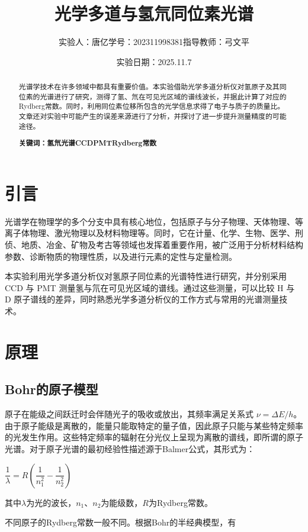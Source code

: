 \documentclass[a4paper, 1.5lines]{ctexart}
\title{光学多道与氢氘同位素光谱}
\author{实验人：唐亿\qquad 学号：202311998381\qquad 指导教师：弓文平}
\date{实验日期：2025.11.7}
\begin{document}
    
    \maketitle
    
    \begin{abstract}
         光谱学技术在许多领域中都具有重要价值。本实验借助光学多道分析仪对氢原子及其同位素的光谱进行了研究，测得了氢、氘在可见光区域的谱线波长，并据此计算了对应的Rydberg常数。同时，利用同位素位移所包含的光学信息求得了电子与质子的质量比。文章还对实验中可能产生的误差来源进行了分析，并探讨了进一步提升测量精度的可能途径。

         \textbf{\textbf{关键词：氢氘光谱\quad CCD\quad PMT\quad Rydberg常数}}
    \end{abstract}
    
    \section{引言}
       光谱学在物理学的多个分支中具有核心地位，包括原子与分子物理、天体物理、等离子体物理、激光物理以及材料物理等。同时，它在计量、化学、生物、医学、刑侦、地质、冶金、矿物及考古等领域也发挥着重要作用，被广泛用于分析材料结构参数、诊断物质的物理性质，以及进行元素的定性与定量检测。

本实验利用光学多道分析仪对氢原子同位素的光谱特性进行研究，并分别采用 CCD 与 PMT 测量氢与氘在可见光区域的谱线。通过这些测量，可以比较 H 与 D 原子谱线的差异，同时熟悉光学多道分析仪的工作方式与常用的光谱测量技术。

    \section{原理}
        \subsection{Bohr的原子模型}
       原子在能级之间跃迁时会伴随光子的吸收或放出，其频率满足关系式 $\nu = \Delta E / h$。由于原子能级是离散的，能量只能取特定的量子值，因此原子只能与某些特定频率的光发生作用。这些特定频率的辐射在分光仪上呈现为离散的谱线，即所谓的原子光谱。对于原子光谱的最初经验性描述源于Balmer公式，其形式为：
            
        \centerline{$\dfrac{1}{\lambda} = R \left(\dfrac{1}{n_1^2} - \dfrac{1}{n_2^2}\right)$}

        其中$\lambda$为光的波长，$n_1$、$n_2$为能级数，$R$为Rydberg常数。

        不同原子的Rydberg常数一般不同。根据Bohr的半经典模型，有
\end{document}
